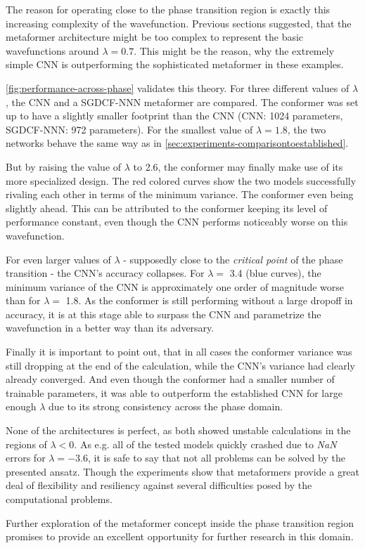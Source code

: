 The reason for operating close to the phase transition region is exactly this increasing complexity of the wavefunction.
Previous sections suggested, that the metaformer architecture might be too \glqq complex\grqq{} to represent the basic wavefunctions around $\lambda = 0.7$. 
This might be the reason, why the extremely simple CNN is outperforming the sophisticated metaformer in these examples.

\autoref{fig:performance-across-phase} validates this theory.
For three different values of $\lambda$, the CNN and a SGDCF-NNN metaformer are compared. 
The conformer was set up to have a slightly smaller footprint than the CNN (CNN: 1024 parameters, SGDCF-NNN: 972 parameters).
For the smallest value of $\lambda = 1.8$, the two networks behave the same way as in \autoref{sec:experiments-comparisontoestablished}. 

But by raising the value of $\lambda$ to \SI[]{2.6}[]{}, the conformer may finally make use of its more specialized design.
The red colored curves show the two models successfully rivaling each other in terms of the minimum variance.
The conformer even being slightly ahead.
This can be attributed to the conformer keeping its level of performance constant, even though the CNN performs noticeably worse on this wavefunction.

For even larger values of $\lambda$ - supposedly close to the \emph{critical point} of the phase transition - the CNN's accuracy collapses. 
For $\lambda=$ \SI[]{3.4}[]{} (blue curves), the minimum variance of the CNN is approximately one order of magnitude worse than for $\lambda=$ \SI[]{1.8}[]{}.
As the conformer is still performing without a large dropoff in accuracy, it is at this stage able to surpass the CNN and parametrize the wavefunction in a better way than its adversary.

Finally it is important to point out, that in all cases the conformer variance was still dropping at the end of the calculation, while the CNN's variance had clearly already converged.
And even though the conformer had a smaller number of trainable parameters, it was able to outperform the established CNN for large enough $\lambda$ due to its strong consistency across the phase domain.

None of the architectures is perfect, as both showed unstable calculations in the regions of $\lambda < 0$. 
As e.g. all of the tested models quickly crashed due to \emph{NaN} errors for $\lambda = -3.6$, it is safe to say that not all problems can be solved by the presented ansatz.
Though the experiments show that metaformers provide a great deal of flexibility and resiliency against several difficulties posed by the computational problems.

Further exploration of the metaformer concept inside the phase transition region promises to provide an excellent opportunity for further research in this domain.
